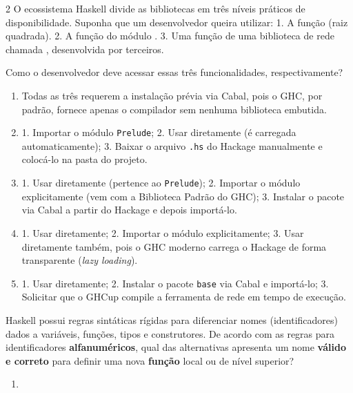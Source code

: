 \documentclass[a4paper,10pt,brazil]{article}
\begin{document}
\begin{multicols}{2}
O ecossistema Haskell divide as bibliotecas em três níveis práticos de disponibilidade. Suponha que um desenvolvedor queira utilizar:
1. A função  (raiz quadrada).
2. A função  do módulo .
3. Uma função de uma biblioteca de rede chamada , desenvolvida por terceiros.

Como o desenvolvedor deve acessar essas três funcionalidades, respectivamente?

\begin{enumerate}
  \item Todas as três requerem a instalação prévia via Cabal, pois o GHC, por padrão, fornece apenas o compilador sem nenhuma biblioteca embutida.

  \item 1. Importar o módulo \texttt{Prelude}; 2. Usar diretamente (é carregada automaticamente); 3. Baixar o arquivo \texttt{.hs} do Hackage manualmente e colocá-lo na pasta do projeto.

  \item 1. Usar diretamente (pertence ao \texttt{Prelude}); 2. Importar o módulo explicitamente (vem com a Biblioteca Padrão do GHC); 3. Instalar o pacote via Cabal a partir do Hackage e depois importá-lo.

  \item 1. Usar diretamente; 2. Importar o módulo explicitamente; 3. Usar diretamente também, pois o GHC moderno carrega o Hackage de forma transparente (\emph{lazy loading}).

  \item 1. Usar diretamente; 2. Instalar o pacote \texttt{base} via Cabal e importá-lo; 3. Solicitar que o GHCup compile a ferramenta de rede em tempo de execução.


\end{enumerate}

Haskell possui regras sintáticas rígidas para diferenciar nomes (identificadores) dados a variáveis, funções, tipos e construtores. De acordo com as regras para identificadores \textbf{alfanuméricos}, qual das alternativas apresenta um nome \textbf{válido e correto} para definir uma nova \textbf{função} local ou de nível superior?

\begin{enumerate}
  \item {}


\end{enumerate}
\end{multicols}
\end{document}
